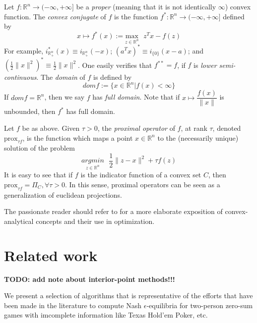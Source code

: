 \documentclass[12pt]{article}
\begin{document}
Let $f : \mathbb{R}^n \rightarrow (-\infty, +\infty]$ be a \textit{proper} (meaning that it is not identically $\infty$) convex function.
The \textit{convex conjugate} of $f$ is the function $f^*: \mathbb{R}^n \rightarrow (-\infty, +\infty]$ defined by
\begin{equation}
  x \mapsto f^*(x) := \underset{z \in \mathbb{R}^n}{\text{max}}\text{ }z^Tx - f(z)
\end{equation}
For example, $i_{\mathbb{R}^{n}_+}^*(x) \equiv i_{\mathbb{R}^{n}_+}(-x)$; $(a^Tx)^* \equiv i_{\{0\}}(x - a)$; and $(\frac{1}{2}\|x\|^2)^* \equiv \frac{1}{2}\|x\|^2$. One easily verifies that $f^{**} = f$, if $f$ is \textit{lower semi-continuous}. The \textit{domain} of $f$ is defined by
\begin{equation}
dom f := \{x \in \mathbb{R}^n | f(x) < \infty\}
\end{equation}
If $dom f = \mathbb{R}^{n}$, then we say $f$ has \textit{full domain}.
Note that if $x \mapsto \dfrac{f(x)}{\|x\|}$ is unbounded, then $f^*$ has full domain.

Let $f$ be as above. Given $\tau > 0$, the \textit{proximal operator} of $f$, at rank
$\tau$, denoted $\text{prox}_{\tau f}$, is the function which maps a point $x \in \mathbb{R}^n$ to the (necessarily
unique) solution of the problem
\begin{equation}
  \underset{z \in \mathbb{R}^n}{argmin}\text{ }\frac{1}{2}\|z - x\|^2 + \tau f(z)
\end{equation}
It is easy to see that if $f$ is the indicator function of a convex set $C$, then $\text{prox}_{\tau f} = \Pi_C, \forall \tau > 0$. In this sense, proximal operators can be seen
as a generalization of euclidean projections. 

The passionate reader should refer to \cite{rockafellar1997convex, combettes2011proximal} for a more elaborate exposition of convex-analytical concepts and their use in optimization.


\section{Related work}
\label{sec:related_work}
\textbf{TODO: add note about interior-point methods!!!}

We present a selection of algorithms that is representative of the efforts that have been made in the literature to compute Nash $\epsilon$-equilibria for two-person zero-sum games with imcomplete information like Texas Hold'em Poker, etc.
\end{document}
